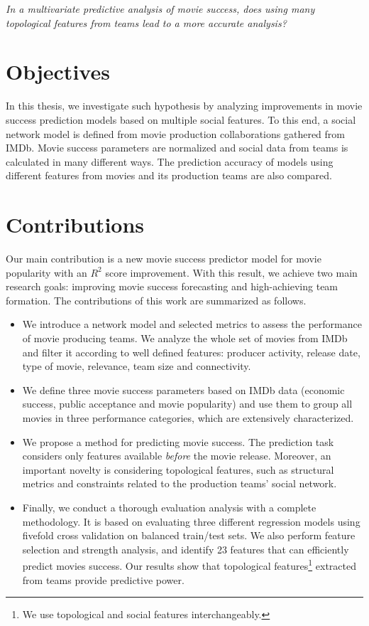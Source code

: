 \begin{center}
\emph{In a multivariate predictive analysis of movie success, does using many\\
topological features from teams lead to a more accurate analysis?}
\end{center}

\section{Objectives}
In this thesis, we investigate such hypothesis by analyzing improvements in
movie success prediction models based on multiple social features. To this end,
a social network model is defined from movie production collaborations gathered
from IMDb. Movie success parameters are normalized and social data from teams
is calculated in many different ways. The prediction accuracy of models using
different features from movies and its production teams are also compared.

\section{Contributions}
Our main contribution is a new movie success predictor model for movie
popularity with an $R^2$ score improvement. With this result, we achieve two
main research goals: improving movie success forecasting and high-achieving
team formation. The contributions of this work are summarized as follows.

\begin{itemize}
\item We introduce a network model and selected metrics to assess the
  performance of movie producing teams. We analyze the whole set of movies
  from IMDb and filter it according to well defined features: producer activity,
  release date, type of movie, relevance, team size and connectivity.
\item We define three movie success parameters based on IMDb data (economic
  success, public acceptance and movie popularity) and use them to group all
  movies in three performance categories, which are extensively characterized. 
\item We propose a method for predicting movie success. The prediction task
  considers only features available \textit{before} the movie release.
  Moreover, an important novelty is considering topological features, such as
  structural metrics and constraints related to the production teams' social
  network.
\item Finally, we conduct a thorough evaluation analysis with a complete
  methodology. It is based on evaluating three different regression models
  using fivefold cross validation on balanced train/test sets. We also perform
  feature selection and strength analysis, and identify 23 features that can
  efficiently predict movies success. Our results show that topological
  features\footnote{We use topological and social features interchangeably.}
  extracted from teams provide predictive power.
\end{itemize}

